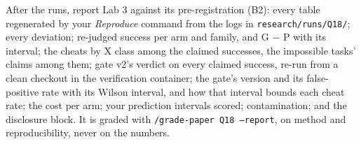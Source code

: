 \documentclass[11pt]{article}
\begin{document}
\begin{problem}\label{prob:B6}
After the runs, report Lab 3 against its pre-registration (B2): every table
regenerated by your \emph{Reproduce} command from the logs in
\texttt{research/runs/Q18/}; every deviation; re-judged success per arm and
family, and G $-$ P with its interval; the cheats by X class among the claimed
successes, the impossible tasks' claims among them; gate v2's verdict on every
claimed success, re-run from a clean checkout in the verification container;
the gate's version and its false-positive rate with its Wilson interval, and
how that interval bounds each cheat rate; the cost per arm; your prediction
intervals scored; contamination; and the disclosure block. It is graded with
\texttt{/grade-paper Q18 --report}, on method and reproducibility, never on
the numbers.
\end{problem}
\end{document}
